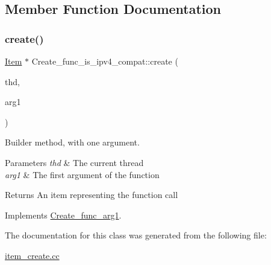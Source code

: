 \subsection{Member Function Documentation}
\mbox{\label{classCreate__func__is__ipv4__compat_aad63c6660a84517a2cbe73206628f9e1}} 
\subsubsection{\texorpdfstring{create()}{create()}}
{\footnotesize\ttfamily \mbox{\hyperlink{classItem}{Item}} $\ast$ Create\+\_\+func\+\_\+is\+\_\+ipv4\+\_\+compat\+::create (\begin{DoxyParamCaption}\item[{T\+HD $\ast$}]{thd,  }\item[{\mbox{\hyperlink{classItem}{Item}} $\ast$}]{arg1 }\end{DoxyParamCaption})\hspace{0.3cm}{\ttfamily [virtual]}}

Builder method, with one argument. 
\begin{DoxyParams}{Parameters}
{\em thd} & The current thread \\
\hline
{\em arg1} & The first argument of the function \\
\hline
\end{DoxyParams}
\begin{DoxyReturn}{Returns}
An item representing the function call 
\end{DoxyReturn}


Implements \mbox{\hyperlink{classCreate__func__arg1_a3e9a98f755cd82c3e762e334c955a8c9}{Create\+\_\+func\+\_\+arg1}}.



The documentation for this class was generated from the following file\+:\begin{DoxyCompactItemize}
\item 
\mbox{\hyperlink{item__create_8cc}{item\+\_\+create.\+cc}}\end{DoxyCompactItemize}
